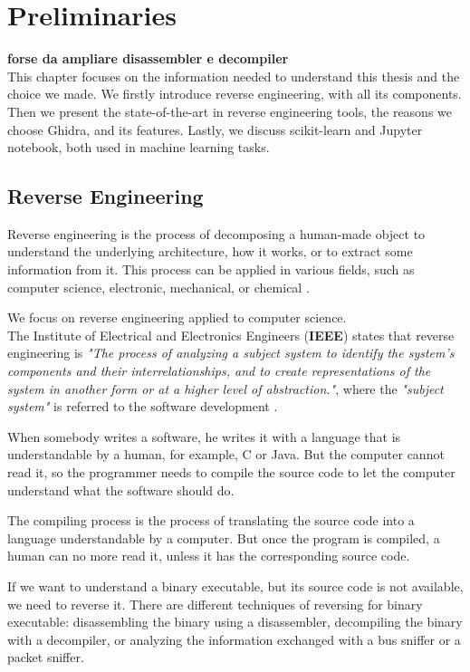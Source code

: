 \chapter{Preliminaries}
\label{ch:prelim}
\textbf{forse da ampliare disassembler e decompiler}\\
This chapter focuses on the information needed to understand this thesis and the choice we made. We firstly introduce reverse engineering, with all its components. Then we present the state-of-the-art in reverse engineering tools, the reasons we choose Ghidra, and its features. Lastly, we discuss scikit-learn and Jupyter notebook, both used in machine learning tasks.

\section{Reverse Engineering}

Reverse engineering is the process of decomposing a human-made object to understand the underlying architecture, how it works, or to extract some information from it. This process can be applied in various fields, such as computer science, electronic, mechanical, or chemical \cite{eilam2011reversing}.

We focus on reverse engineering applied to computer science. 
\\

The Institute of Electrical and Electronics Engineers (\textbf{IEEE}) states that reverse engineering is \textit{"The process of analyzing a subject system to identify the system's components and their interrelationships, and to create representations of the system in another form or at a higher level of abstraction."}, where the \textit{"subject system"} is referred to the software development \cite{chikofsky1990reverse}. 

When somebody writes a software, he writes it with a language that is understandable by a human, for example, C or Java.  But the computer cannot read it, so the programmer needs to compile the source code to let the computer understand what the software should do. 

The compiling process is the process of translating the source code into a language understandable by a computer. But once the program is compiled, a human can no more read it, unless it has the corresponding source code. 

If we want to understand a binary executable, but its source code is not available, we need to reverse it. There are different techniques of reversing for binary executable: disassembling the binary using a disassembler, decompiling the binary with a decompiler, or analyzing the information exchanged with a bus sniffer or a packet sniffer.


